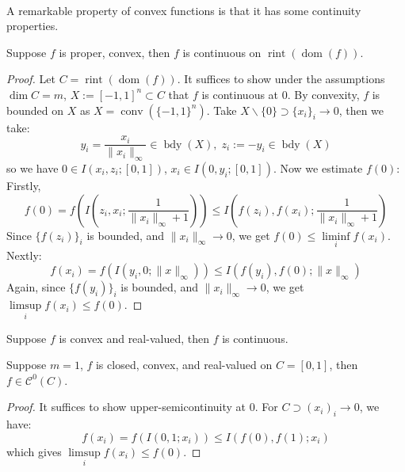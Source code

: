 \paragraph{}A remarkable property of convex functions is that it has some continuity properties.

\begin{prop}
	\label{prop:022-continuity}
	Suppose $f$ is proper, convex, then $f$ is continuous on $\operatorname{rint}(\operatorname{dom}(f))$.
\end{prop}

\begin{proof}
	Let $C=\operatorname{rint}(\operatorname{dom}(f))$. It suffices to show under the assumptions $\dim C=m$, $X:=[-1,1]^n\subset C$ that $f$ is continuous at $0$. By convexity, $f$ is bounded on $X$ as $X=\operatorname{conv}(\{-1,1\}^n)$. Take $X\smallsetminus\{0\}\supset \{x_i\}_i\to 0$, then we take:
	\[
		y_i=\frac{x_i}{\|x_i\|_\infty}\in \operatorname{bdy}(X),\;
		z_i:=-y_i\in \operatorname{bdy}(X)
	\]
	so we have $0\in I(x_i,z_i;[0,1])$, $x_i\in I(0,y_i;[0,1])$. Now we estimate $f(0)$: Firstly,
	\[
		f(0)=f\left(I\left(z_i,x_i;\frac{1}{\|x_i\|_\infty+1}\right)\right)\leq I\left(f(z_i),f(x_i);\frac{1}{\|x_i\|_\infty+1}\right)
	\]
	Since $\{f(z_i)\}_i$ is bounded, and $\|x_i\|_\infty\to0$, we get $f(0)\leq \underset{i}{\operatorname{liminf}}f(x_i)$. Nextly:
	\[
		f(x_i)=f(I(y_i, 0;\|x\|_\infty))\leq I(f(y_i),f(0);\|x\|_\infty)
	\]
	Again, since $\{f(y_i)\}_i$ is bounded, and $\|x_i\|_\infty\to0$, we get $\underset{i}{\operatorname{limsup}}f(x_i)\leq f(0)$.
\end{proof}

\begin{coro}
	\label{coro:022-continuity-real-valued}
	Suppose $f$ is convex and real-valued, then $f$ is continuous.
\end{coro}

\begin{coro}
	\label{coro:022-line-continuity}
	Suppose $m=1$, $f$ is closed, convex, and real-valued on $C=[0,1]$, then $f\in \mathscr{C}^0(C)$.
\end{coro}

\begin{proof}
	It suffices to show upper-semicontinuity at $0$. For $C\supset (x_i)_i\to 0$, we have:
	\[
		f(x_i)=f(I(0,1;x_i))\leq I(f(0),f(1); x_i)
	\]
	which gives $\underset{i}{\operatorname{limsup}}f(x_i)\leq f(0)$.
\end{proof}

